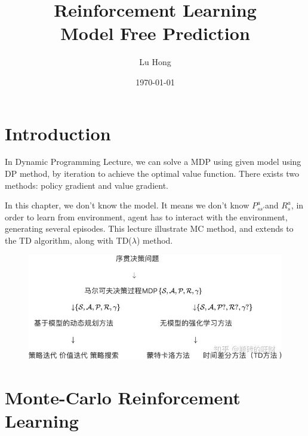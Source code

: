 \documentclass[12pt, a4paper]{paper}
\title{Reinforcement Learning \\ Model Free Prediction}
\author{ Lu Hong }
\date{\today}
\newcommand{\transitionProb}[0]{$P_{ss'}^{a}$}
\newcommand{\reward}[0]{$R_{s}^{a}$}
\begin{document}
\maketitle	
% 




\section{Introduction}
In Dynamic Programming Lecture, we can solve a MDP using given model using DP method, by iteration to achieve the optimal value function.
There exists two methods: policy gradient and value gradient.

In this chapter, we don't know the model. It means we don't know \transitionProb and \reward, in order to learn from environment, 
agent has to interact with the environment, generating several episodes. This lecture illustrate MC method, and extends to the TD 
algorithm, along with TD($\lambda$) method.


\begin{figure}[h]
	\begin{center}
		\includegraphics[width = \linewidth]{v2-52171db8d68b627b78282004c1c564f9_hd.jpg}				
	\end{center}
\end{figure}

\section{Monte-Carlo Reinforcement Learning}
\end{document}
